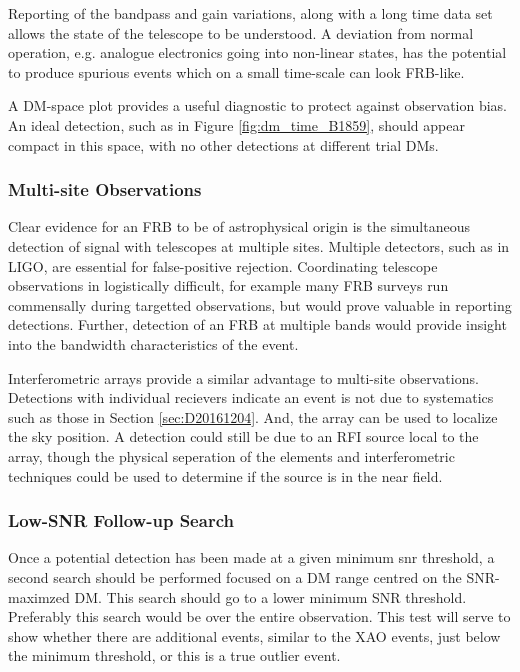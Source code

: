 \documentclass[a4paper,fleqn,usenatbib]{mnras}
\begin{document}
Reporting of the bandpass and gain variations, along with a long time data set
allows the state of the telescope to be understood. A deviation from normal
operation, e.g. analogue electronics going into non-linear states, has the
potential to produce spurious events which on a small time-scale can look
FRB-like.

A DM-space plot provides a useful diagnostic to protect against observation
bias. An ideal detection, such as in Figure \ref{fig:dm_time_B1859}, should
appear compact in this space, with no other detections at different trial DMs.

\subsubsection{Multi-site Observations}

Clear evidence for an FRB to be of astrophysical origin is the simultaneous
detection of signal with telescopes at multiple sites. Multiple detectors, such
as in LIGO, are essential for false-positive rejection. Coordinating telescope
observations in logistically difficult, for example many FRB surveys run
commensally during targetted observations, but would prove valuable in reporting
detections.  Further, detection of an FRB at multiple bands would provide
insight into the bandwidth characteristics of the event.

Interferometric arrays provide a similar advantage to multi-site observations.
Detections with individual recievers indicate an event is not due to systematics
such as those in Section \ref{sec:D20161204}. And, the array can be used to
localize the sky position. A detection could still be due to an RFI source local to
the array, though the physical seperation of the elements and interferometric
techniques could be used to determine if the source is in the near field.


\subsubsection{Low-SNR Follow-up Search}

Once a potential detection has been made at a given minimum \gls{snr} threshold,
a second search should be performed focused on a DM range centred on the
SNR-maximzed DM. This search should go to a lower minimum SNR threshold.
Preferably this search would be over the entire observation. This test will
serve to show whether there are additional events, similar to the XAO events,
just below the minimum threshold, or this is a true outlier event.
\end{document}
